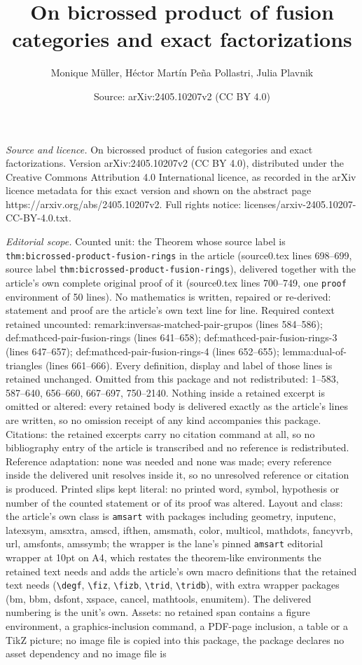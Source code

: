 \documentclass[10pt,a4paper]{amsart}
\title[On bicrossed product of fusion categories and exact factoriz]{On bicrossed product of fusion categories and exact factorizations}
\author{Monique M\"uller, H\'ector Mart\'in Pe\~na Pollastri, Julia Plavnik}
\date{Source: arXiv:2405.10207v2 (CC BY 4.0)}
\begin{document}
\maketitle

\noindent\emph{Source and licence.} On bicrossed product of fusion categories and exact factorizations. Version arXiv:2405.10207v2 (CC BY 4.0), distributed under the Creative Commons Attribution 4.0 International licence, as recorded in the arXiv licence metadata for this exact version and shown on the abstract page https://arxiv.org/abs/2405.10207v2. Full rights notice: licenses/arxiv-2405.10207-CC-BY-4.0.txt.\par\smallskip

\noindent\textit{Editorial scope.} Counted unit: the Theorem whose source label is \texttt{thm:bicrossed-product-fusion-rings} in the article (source0.tex lines 698--699, source label \texttt{thm:bicrossed-product-fusion-rings}), delivered together with the article's own complete original proof of it (source0.tex lines 700--749, one \texttt{proof} environment of 50 lines). No mathematics is written, repaired or re-derived: statement and proof are the article's own text line for line. Required context retained uncounted: remark:inversas-matched-pair-grupos (lines 584--586); def:mathced-pair-fusion-rings (lines 641--658); def:mathced-pair-fusion-rings-3 (lines 647--657); def:mathced-pair-fusion-rings-4 (lines 652--655); lemma:dual-of-triangles (lines 661--666). Every definition, display and label of those lines is retained unchanged. Omitted from this package and not redistributed: 1--583, 587--640, 656--660, 667--697, 750--2140. Nothing inside a retained excerpt is omitted or altered: every retained body is delivered exactly as the article's lines are written, so no omission receipt of any kind accompanies this package. Citations: the retained excerpts carry no citation command at all, so no bibliography entry of the article is transcribed and no reference is redistributed. Reference adaptation: none was needed and none was made; every reference inside the delivered unit resolves inside it, so no unresolved reference or citation is produced. Printed slips kept literal: no printed word, symbol, hypothesis or number of the counted statement or of its proof was altered. Layout and class: the article's own class is \texttt{amsart} with packages including geometry, inputenc, latexsym, amsxtra, amscd, ifthen, amsmath, color, multicol, mathdots, fancyvrb, url, amsfonts, amssymb; the wrapper is the lane's pinned \texttt{amsart} editorial wrapper at 10pt on A4, which restates the theorem-like environments the retained text needs and adds the article's own macro definitions that the retained text needs (\texttt{\textbackslash degf}, \texttt{\textbackslash fiz}, \texttt{\textbackslash fizb}, \texttt{\textbackslash trid}, \texttt{\textbackslash tridb}), with extra wrapper packages (bm, bbm, dsfont, xspace, cancel, mathtools, enumitem). The delivered numbering is the unit's own. Assets: no retained span contains a figure environment, a graphics-inclusion command, a PDF-page inclusion, a table or a TikZ picture; no image file is copied into this package, the package declares no asset dependency and no image file is 
\end{document}
